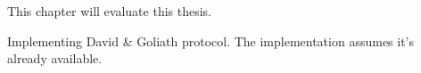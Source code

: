 \label{sec:evaluation}

This chapter will evaluate this thesis.



Implementing David \& Goliath protocol. The implementation assumes it's already
available.
